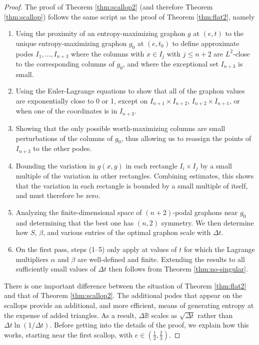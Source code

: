 \documentclass[12pt]{amsart}
\newcommand{\B}{\mathbb{B}}
\newcommand{\Value}{worth}
\begin{document}
{\begin{proof} 
The proof of Theorem \ref{thm:scallop2} (and therefore
Theorem \ref{thm:scallop}) follows the same script 
as the proof of Theorem \ref{thm:flat2}, namely 
\begin{enumerate}
\item Using the proximity of an entropy-maximizing graphon $g$ at 
$(e,t)$ to the unique entropy-maximizing graphon $g_0$ at $(e,t_0)$ 
to define 
approximate podes $I_1, \ldots, I_{n+3}$ where the columns with 
$x\in I_j$ with $j \le n+2$ 
are $L^2$-close to the corresponding columns of $g_0$, and where
the exceptional set $I_{n+3}$ is small. 
\item Using the Euler-Lagrange equations to show that all of the graphon values are exponentially 
close to 0 or 1, except on $I_{n+1} \times I_{n+2}$, $I_{n+2} \times I_{n+1}$, or when one of the
coordinates is in $I_{n+3}$. 
\item Showing that the only possible \Value-maximizing columns are small 
perturbations of the columns of $g_0$, thus allowing us to reassign the 
points of $I_{n+3}$ to the other podes. 
\item Bounding the variation in $g(x,y)$ in each rectangle $I_i \times I_j$ by a small multiple of the variation
in other rectangles. Combining estimates, this shows that the variation in each rectangle is bounded by 
a small multiple of itself, and must therefore be zero. 
\item Analyzing the finite-dimensional space of $(n+2)$-podal graphons near $g_0$ and determining that the
best one has $(n,2)$ symmetry. We then determine 
how $S$, $\beta$, and various entries of the optimal graphon scale with $\Delta t$. 
\item On the first pass, steps (1--5) only apply at values of $t$ for which the Lagrange 
multipliers $\alpha$ and $\beta$ are well-defined and finite. Extending the results to all sufficiently
small values of $\Delta t$ then follows from Theorem \ref{thm:no-singular}.
\end{enumerate}

There is one important difference between the situation of Theorem \ref{thm:flat2} and that of 
Theorem \ref{thm:scallop2}. The
additional podes that appear on the scallops provide an additional, and more efficient, means of generating
entropy at the expense of added triangles. As a result, $\Delta \B$ scales as $\sqrt{\Delta t}$
rather than $\Delta t \ln(1/\Delta t)$. Before getting into the details of the proof, we explain how
this works, starting near the first scallop, 
with $e \in (\frac12, \frac23)$. 


\end{proof}}
\end{document}
